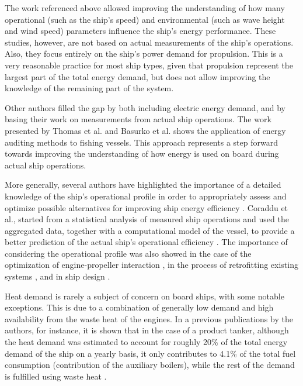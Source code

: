 \documentclass[preprint,12pt]{elsarticle}
\begin{document}
The work referenced above allowed improving the understanding of how many operational (such as the ship's speed) and environmental (such as wave height and wind speed) parameters influence the ship's energy performance. These studies, however, are not based on actual measurements of the ship's operations. Also, they focus entirely on the ship's power demand for propulsion. This is a very reasonable practice for most ship types, given that propulsion represent the largest part of the total energy demand, but does not allow improving the knowledge of the remaining part of the system.

Other authors filled the gap by both including electric energy demand, and by basing their work on measurements from actual ship operations. The work presented by Thomas et al. \cite{Thomas2010} and Basurko et al. \cite{Basurko2013} shows the application of energy auditing methods to fishing vessels. This approach represents a step forward towards improving the understanding of how energy is used on board during actual ship operations.  

More generally, several authors have highlighted the importance of a detailed knowledge of the ship's operational profile in order to appropriately assess and optimize possible alternatives for improving ship energy efficiency \cite{Banks2013}. Coraddu et al., started from a statistical analysis of measured ship operations and used the aggregated data, together with a computational model of the vessel, to provide a better prediction of the actual ship's operational efficiency \cite{Coraddu2014}. The importance of considering the operational profile was also showed in the case of the optimization of engine-propeller interaction \cite{Baldi2015c}, in the process of retrofitting existing systems \cite{Baldi2015b,Choi2013}, and in ship design \cite{Ghassemi2017,Solem2015}. 

Heat demand is rarely a subject of concern on board ships, with some notable exceptions. This is due to a combination of generally low demand and high availability from the waste heat of the engines. In a previous publications by the authors, for instance, it is shown that in the case of a product tanker, although the heat demand was estimated to account for roughly 20\% of the total energy demand of the ship on a yearly basis, it only contributes to 4.1\% of the total fuel consumption (contribution of the auxiliary boilers), while the rest of the demand is fulfilled using waste heat \cite{Baldi2015a}.
\end{document}
